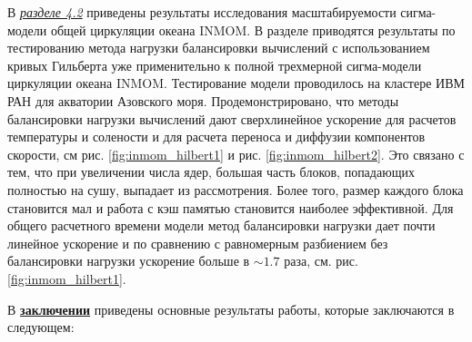 В \underline{\textit{разделе 4.2}} приведены результаты исследования масштабируемости сигма-модели общей циркуляции океана INMOM.
В разделе приводятся результаты по тестированию метода нагрузки балансировки вычислений с использованием кривых Гильберта уже примени­тельно к полной трехмерной сигма-модели циркуляции океана INMOM. Тестирование модели проводилось на кластере ИВМ РАН для акватории Азовского моря.
Продемонстрировано, что методы балансировки нагрузки вычислений дают сверхлинейное ускорение для расче­тов температуры и солености и для расчета переноса и диффузии компонентов скорости, см рис. \ref{fig:inmom_hilbert1} и рис. \ref{fig:inmom_hilbert2}.
Это связано с тем, что при увеличении числа ядер, большая часть блоков, попадающих полностью на сушу, выпадает из рассмотрения. Более то­го, размер каждого блока становится мал и работа с кэш памятью становится наиболее эффективной.
Для общего расчетного времени модели метод балансировки нагрузки дает почти линейное ускорение и по сравнению с равномерным разбиением без балансировки нагрузки ускорение больше в $\sim 1.7$ раза, см. рис. \ref{fig:inmom_hilbert1}.

\FloatBarrier
{}                                  %
В \underline{\textbf{заключении}} приведены основные результаты работы, которые заключаются в следующем:




